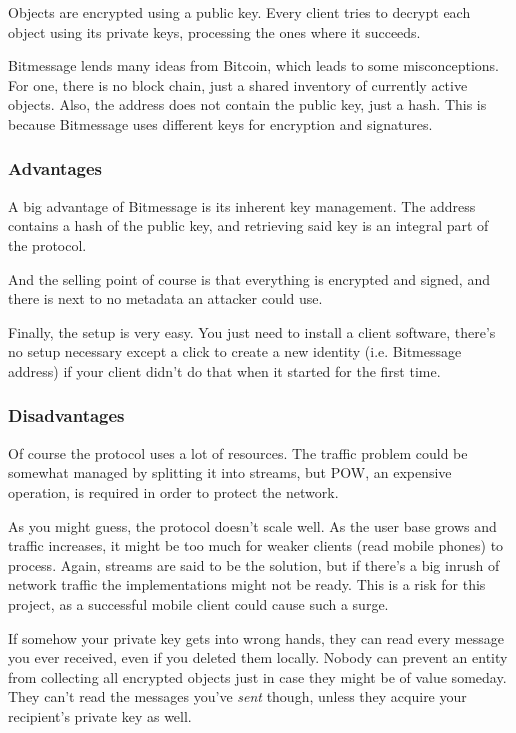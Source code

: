 \documentclass{bfh}
\begin{document}
  Objects are encrypted using a public key. Every client tries to decrypt each object using its private keys, processing the ones where it succeeds.

  Bitmessage lends many ideas from Bitcoin, which leads to some misconceptions. For one, there is no block chain, just a shared inventory of currently active objects. Also, the address does not contain the public key, just a hash. This is because Bitmessage uses different keys for encryption and signatures.

  \subsubsection{Advantages}
  A big advantage of Bitmessage is its inherent key management. The address contains a hash of the public key, and retrieving said key is an integral part of the protocol.

  And the selling point of course is that everything is encrypted and signed, and there is next to no metadata an attacker could use.

  Finally, the setup is very easy. You just need to install a client software, there's no setup necessary except a click to create a new identity (i.e. Bitmessage address) if your client didn't do that when it started for the first time.

  \subsubsection{Disadvantages}
  Of course the protocol uses a lot of resources. The traffic problem could be somewhat managed by splitting it into streams\cite{wiki:stream}, but \acf{POW}, an expensive operation, is required in order to protect the network.

  As you might guess, the protocol doesn't scale well. As the user base grows and traffic increases, it might be too much for weaker clients (read mobile phones) to process. Again, streams are said to be the solution, but if there's a big inrush of network traffic the implementations might not be ready. This is a risk for this project, as a successful mobile client could cause such a surge.

  If somehow your private key gets into wrong hands, they can read every message you ever received, even if you deleted them locally. Nobody can prevent an entity from collecting all encrypted objects just in case they might be of value someday. They can't read the messages you've \textit{sent} though, unless they acquire your recipient's private key as well.
\end{document}
